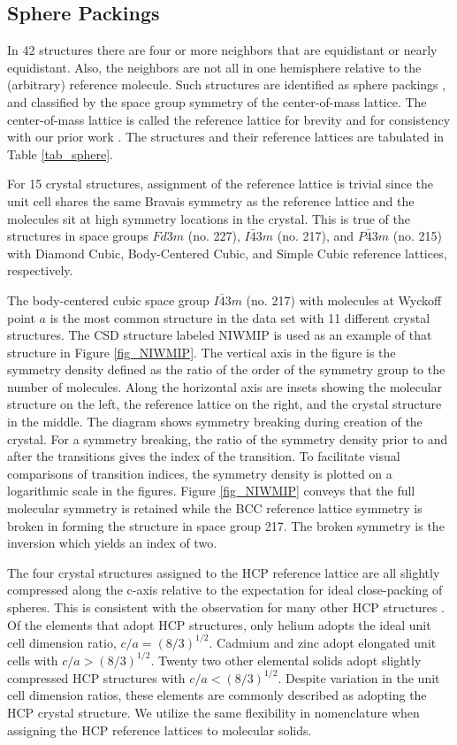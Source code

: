 \documentclass[preprint]{iucr}              %
\begin{document}
\subsection{Sphere Packings}

In 42 structures there are four or more neighbors that are equidistant or nearly equidistant.  Also, the neighbors are not all in one hemisphere relative to the (arbitrary) reference molecule.  Such structures are identified as sphere packings \cite{Conway98}, and classified by the space group symmetry of the center-of-mass lattice.  The center-of-mass lattice is called the reference lattice for brevity and for consistency with our prior work \cite{Keith04c,Mettes04}.  The structures and their reference lattices are tabulated in Table \ref{tab_sphere}.

For 15 crystal structures, assignment of the reference lattice is trivial since the unit cell shares the same Bravais symmetry as the reference lattice and the molecules sit at high symmetry locations in the crystal.  This is true of the structures in space groups $Fd3m$ (no. 227), $I\bar{4}3m$ (no. 217), and $P\bar{4}3m$ (no. 215) with Diamond Cubic, Body-Centered Cubic, and Simple Cubic reference lattices, respectively.  

The body-centered cubic space group $I\bar{4}3m$ (no. 217) with molecules at Wyckoff point $a$ is the most common structure in the data set with 11 different crystal structures.  The CSD structure labeled NIWMIP is used as an example of that structure in Figure \ref{fig_NIWMIP}.  The vertical axis in the figure is the symmetry density defined as the ratio of the order of the symmetry group to the number of molecules.  Along the horizontal axis are insets showing the molecular structure on the left, the reference lattice on the right, and the crystal structure in the middle.  The diagram shows symmetry breaking during creation of the crystal.  For a symmetry breaking, the ratio of the symmetry density prior to and after the transitions gives the index of the transition.  To facilitate visual comparisons of transition indices, the symmetry density is plotted on a logarithmic scale in the figures.  Figure \ref{fig_NIWMIP} conveys that the full molecular symmetry is retained while the BCC reference lattice symmetry is broken in forming the structure in space group 217.  The broken symmetry is the inversion which yields an index of two.

The four crystal structures assigned to the HCP reference lattice are all slightly compressed along the c-axis relative to the expectation for ideal close-packing of spheres.  This is consistent with the observation for many other HCP structures \cite{Sands93}.  Of the elements that adopt HCP structures, only helium adopts the ideal unit cell dimension ratio, $c/a=(8/3)^{1/2}$.  Cadmium and zinc adopt elongated unit cells with $c/a>(8/3)^{1/2}$.  Twenty two other elemental solids adopt slightly compressed HCP structures with $c/a<(8/3)^{1/2}$.  Despite variation in the unit cell dimension ratios, these elements are commonly described as adopting the HCP crystal structure.  We utilize the same flexibility in nomenclature when assigning the HCP reference lattices to molecular solids.
\end{document}
